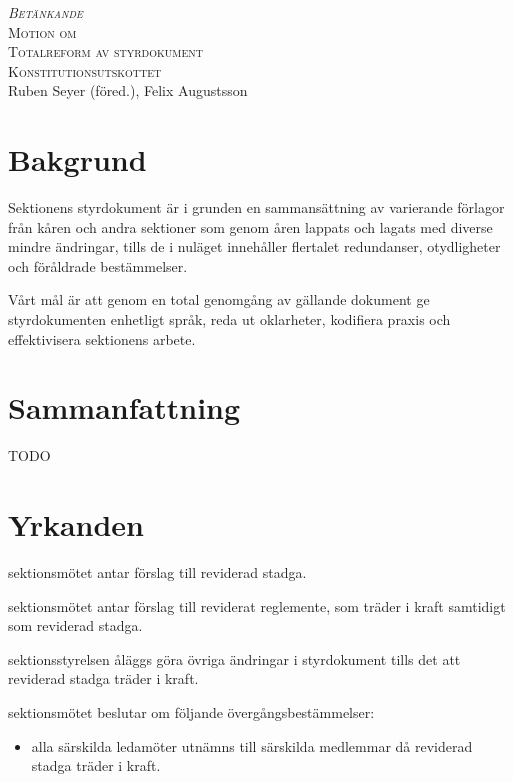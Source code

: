 \documentclass{article}
\newcommand{\motionsnamn}{Totalreform av styrdokument}
\newcommand{\motionar}{Konstitutionsutskottet}
\begin{document}
\begin{center}
\textsc{\huge\itshape Betänkande}\\[0.5cm]
\textsc{\Huge Motion om}\\[0.5cm]
\textsc{\huge \motionsnamn}\\[0.5cm]
\textsc{\large \motionar\\}
Ruben Seyer (föred.), Felix Augustsson
\end{center}

\section*{Bakgrund}
Sektionens styrdokument är i grunden en sammansättning av varierande förlagor från kåren och andra sektioner som genom åren lappats och lagats med diverse mindre ändringar, tills de i nuläget innehåller flertalet redundanser, otydligheter och föråldrade bestämmelser.

Vårt mål är att genom en total genomgång av gällande dokument ge styrdokumenten enhetligt språk, reda ut oklarheter, kodifiera praxis och effektivisera sektionens arbete.

\section*{Sammanfattning}
TODO

\section*{Yrkanden}
\begin{beslut}
	\item sektionsmötet antar förslag till reviderad stadga.
	\item sektionsmötet antar förslag till reviderat reglemente, som träder i kraft samtidigt som reviderad stadga.
	\item sektionsstyrelsen åläggs göra övriga ändringar i styrdokument tills det att reviderad stadga träder i kraft.
	\item sektionsmötet beslutar om följande övergångsbestämmelser:
	\begin{itemize}
	    \item alla särskilda ledamöter utnämns till särskilda medlemmar då reviderad stadga träder i kraft.
	\end{itemize}
\end{beslut}

\tableofcontents
\clearpage

\end{document}
